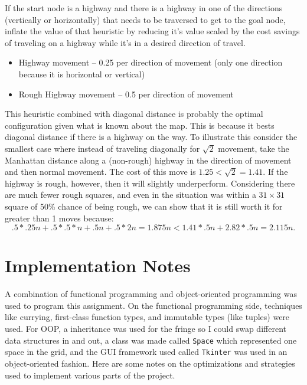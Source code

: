 \documentclass[11pt,letter]{article}
\begin{document}
If the start node is a highway and there is a highway in one of the directions (vertically or horizontally) that needs to be traversed to get to the goal node, inflate the value of that heuristic by reducing it’s value scaled by the cost savings of traveling on a highway while it’s in a desired direction of travel.

\begin{itemize}
    \item Highway movement -- 0.25 per direction of movement (only one direction because it is horizontal or vertical)
    \item Rough Highway movement -- 0.5 per direction of movement
\end{itemize}

This heuristic combined with diagonal distance is probably the optimal configuration given what is known about the map. This is because it bests diagonal distance if there is a highway on the way. To illustrate this consider the smallest case where instead of traveling diagonally for $\sqrt{2}$ movement, take the Manhattan distance along a (non-rough) highway in the direction of movement and then normal movement. The cost of this move is $1.25 < \sqrt{2} = 1.41$. If the highway is rough, however, then it will slightly underperform. Considering there are much fewer rough squares, and even in the situation was within a $31\times31$ square of 50\% chance of being rough, we can show that it is still worth it for greater than 1 moves because:
\begin{equation}
    .5*.25n + .5*.5*n + .5n + .5*2n = 1.875n < 1.41*.5n + 2.82*.5n = 2.115n.
\end{equation}

\section{Implementation Notes}
A combination of functional programming and object-oriented programming was used to program this assignment. On the functional programming side, techniques like currying, first-class function types, and immutable types (like tuples) were used. For OOP, a inheritance was used for the fringe so I could swap different data structures in and out, a class was made called \verb_Space_ which represented one space in the grid, and the GUI framework used called \verb_Tkinter_ was used in an object-oriented fashion. Here are some notes on the optimizations and strategies used to implement various parts of the project.
\end{document}
